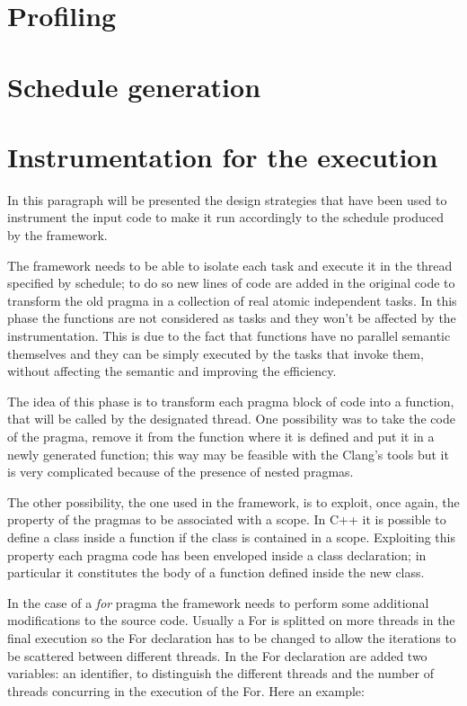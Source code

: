 \documentclass[a4paper,11pt,oneside]{book}
\begin{document}
\section{Profiling}
\section{Schedule generation}
\section{Instrumentation for the execution}

In this paragraph will be presented the design strategies that have been used to instrument the input code to make it run accordingly to the schedule produced by the framework. 

The framework needs to be able to isolate each task and execute it in the thread specified by schedule; to do so new lines of code are added in the original code to transform the old pragma in a collection of real atomic independent tasks. In this phase the functions are not considered as tasks and they won’t be affected by the instrumentation. This is due to the fact that functions have no parallel semantic themselves and they can be simply executed by the tasks that invoke them, without affecting the semantic and improving the efficiency.

The idea of this phase is to transform each pragma block of code into a function, that will be called by the designated thread. One possibility was to take the code of the pragma, remove it from the function where it is defined and put it in a newly generated function; this way may be feasible with the Clang’s tools but it is very complicated because of the presence of nested pragmas. 

The other possibility, the one used in the framework, is to exploit, once again, the property of the pragmas to be associated with a scope. In C++ it is possible to define a class inside a function if the class is contained in a scope. Exploiting this property each pragma code has been enveloped inside a class declaration; in particular it constitutes the body of a function defined inside the new class.

In the case of a \emph{for} pragma the framework needs to perform some additional modifications to the source code. Usually a For is splitted on more threads in the final execution so the For declaration has to be changed to allow the iterations to be scattered between different threads. In the For declaration are added two variables: an identifier, to distinguish the different threads and the number of threads concurring in the execution of the For. Here an example:
\end{document}
